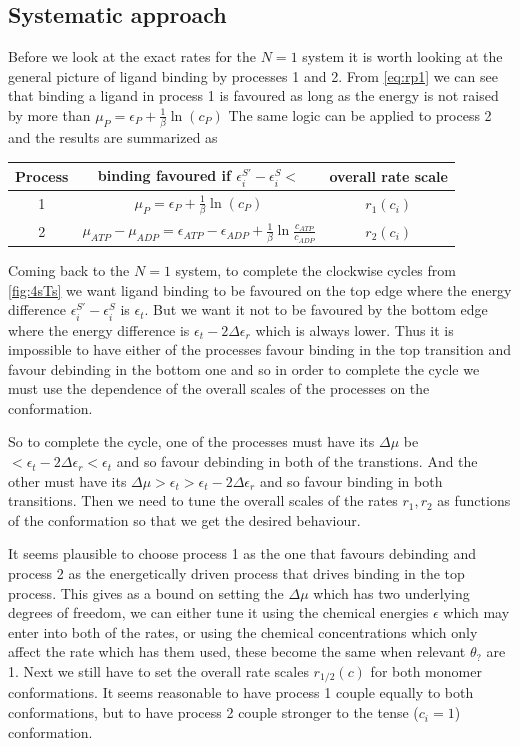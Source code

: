 \documentclass[11pt]{article}
\begin{document}
\subsection{Systematic approach}\label{sec:fcsys}
Before we look at the exact rates for the $N=1$ system it is worth looking at the general picture of ligand binding by processes 1 and 2.
From \cref{eq:rp1} we can see that binding a ligand in process 1 is favoured as long as the energy is not raised by more than $\mu_P = \epsilon_P+\frac{1}{\beta}\ln(c_P)$
The same logic can be applied to process 2 and the results are summarized as
\begin{table}[H]
    \centering
    \begin{tabular}{c|c|c}
        Process & binding favoured if $\epsilon^{S'}_i-\epsilon^S_i<$ & overall rate scale \\
        \hline
        1 & $\mu_P = \epsilon_P+\frac{1}{\beta}\ln(c_P)$ & $r_1(c_i)$ \\
        \hline
        2 & $\mu_{ATP}-\mu_{ADP} = \epsilon_{ATP}-\epsilon_{ADP}+\frac{1}{\beta}\ln{\frac{c_{ATP}}{c_{ADP}}}$ & $r_2(c_i)$
    \end{tabular}
\end{table}
Coming back to the $N=1$ system, to complete the clockwise cycles from \cref{fig:4sTs} we want ligand binding to be favoured on the top edge where the energy difference $\epsilon^{S'}_i-\epsilon^S_i$ is $\epsilon_t$.
But we want it not to be favoured by the bottom edge where the energy difference is $\epsilon_t-2\Delta\epsilon_r$ which is always lower.
Thus it is impossible to have either of the processes favour binding in the top transition and favour debinding in the bottom one and so in order to complete the cycle we must use the dependence of the overall scales of the processes on the conformation.

So to complete the cycle, one of the processes must have its $\Delta\mu$ be $<\epsilon_t-2\Delta\epsilon_r<\epsilon_t$ and so favour debinding in both of the transtions.
And the other must have its $\Delta\mu > \epsilon_t > \epsilon_t-2\Delta\epsilon_r$ and so favour binding in both transitions.
Then we need to tune the overall scales of the rates $r_1, r_2$ as functions of the conformation so that we get the desired behaviour.

It seems plausible to choose process 1 as the one that favours debinding and process 2 as the energetically driven process that drives binding in the top process.
This gives as a bound on setting the $\Delta\mu$ which has two underlying degrees of freedom, we can either tune it using the chemical energies $\epsilon$ which may enter into both of the rates, or using the chemical concentrations which only affect the rate which has them used, these become the same when relevant $\theta_?$ are 1.
Next we still have to set the overall rate scales $r_{1/2}(c)$ for both monomer conformations.
It seems reasonable to have process 1 couple equally to both conformations, but to have process 2 couple stronger to the tense ($c_i=1$) conformation.
\end{document}
